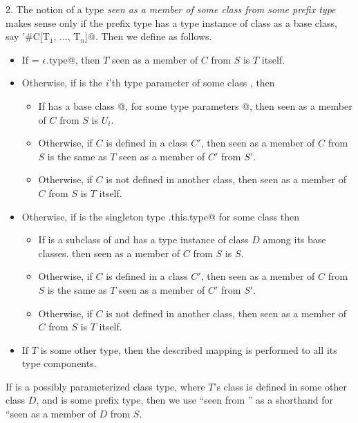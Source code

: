 \documentclass[11pt]{report}
\begin{document}
2. The notion of a type \verb@T@
{\em seen as a member of some class \verb@C@ from some prefix type
\verb@S@} makes sense only if the prefix type \verb@S@
has a type instance of class \verb@C@ as a base class, say
\verb@S'#C[T$_1$, ..., T$_n$]@. Then we define as follows.
\begin{itemize}
 \item 
  If \verb@S = $\epsilon$.type@, then $T$ seen as a member of $C$ from $S$ is $T$ itself.
 \item Otherwise, if \verb@T@ is the $i$'th type parameter of some class \verb@D@, then
   \begin{itemize}
   \item
   If \verb@S@ has a base class \verb@D[U$_1$, ..., U$_n$]@, for some type parameters
   \verb@[U$_1$, ..., U$_n$]@, then \verb@T@ seen as a member of $C$ from $S$ is $U_i$.
   \item
   Otherwise, if $C$ is defined in a class $C'$, then
   \verb@T@ seen as a member of $C$ from $S$ is the same as $T$ seen as
   a member of $C'$ from $S'$.
   \item
   Otherwise, if $C$ is not defined in another class, then  
   \verb@T@ seen as a member of $C$ from $S$ is $T$ itself.
  \end{itemize}
\item
   Otherwise, 
   if \verb@T@ is the singleton type \verb@D.this.type@ for some class \verb@D@
   then
   \begin{itemize}
   \item
   If \verb@D@ is a subclass of \verb@C@ and 
   \verb@S@ has a type instance of class $D$ among its base classes.
   then \verb@T@ seen as a member of $C$ from $S$ is $S$.
   \item
   Otherwise, if $C$ is defined in a class $C'$, then
   \verb@T@ seen as a member of $C$ from $S$ is the same as $T$ seen as
   a member of $C'$ from $S'$.
   \item
   Otherwise, if $C$ is not defined in another class, then  
   \verb@T@ seen as a member of $C$ from $S$ is $T$ itself.
   \end{itemize}
\item
  If $T$ is some other type, then the described mapping is performed
  to all its type components.
\end{itemize}

If \verb@T@ is a possibly parameterized class type, where $T$'s class
is defined in some other class $D$, and \verb@S@ is some prefix type,
then we use ``\verb@T@ seen from \verb@S@'' as a shorthand for
``\verb@T@ seen as a member of $D$ from $S$.
\end{document}
